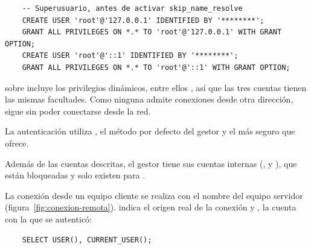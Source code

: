 \begin{verbatim}
	-- Superusuario, antes de activar skip_name_resolve
	CREATE USER 'root'@'127.0.0.1' IDENTIFIED BY '********';
	GRANT ALL PRIVILEGES ON *.* TO 'root'@'127.0.0.1' WITH GRANT OPTION;
	CREATE USER 'root'@'::1' IDENTIFIED BY '********';
	GRANT ALL PRIVILEGES ON *.* TO 'root'@'::1' WITH GRANT OPTION;
\end{verbatim}

 sobre  incluye los privilegios dinámicos, entre ellos , así que las tres cuentas tienen las mismas facultades. Como ninguna admite conexiones desde otra dirección,  sigue sin poder conectarse desde la red.

La autenticación utiliza , el método por defecto del gestor y el más seguro que ofrece.

Además de las cuentas descritas, el gestor tiene sus cuentas internas (,  y ), que están bloqueadas y solo existen para .

La conexión desde un equipo cliente se realiza con el nombre del equipo servidor (figura~\ref{fig:conexion-remota}).  indica el origen real de la conexión y , la cuenta con la que se autenticó:

\begin{verbatim}
	SELECT USER(), CURRENT_USER();
\end{verbatim}

